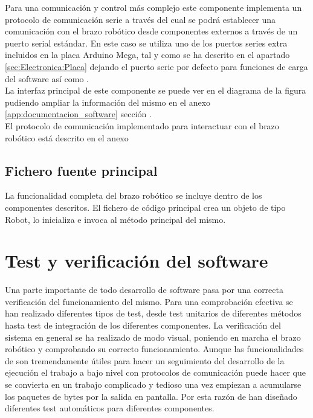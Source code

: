         Para una comunicación y control más complejo este componente implementa un protocolo de comunicación serie a través del cual se podrá establecer una comunicación con el brazo robótico desde componentes externos a través de un puerto serial estándar. En este caso se utiliza uno de los puertos series extra incluidos en la placa Arduino Mega, tal y como se ha descrito en el apartado \ref{sec:Electronica:Placa} dejando el puerto serie por defecto para funciones de carga del software así como .
        \\
        
        La interfaz principal de este componente se puede ver en el diagrama de la figura \completar pudiendo ampliar la información del mismo en el anexo \ref{app:documentacion_software} sección \completar.
        \\
        
        El protocolo de comunicación implementado para interactuar con el brazo robótico está descrito en el anexo \completar

    \subsection{Fichero fuente principal} \label{subsec:SW:maincpp}
        La funcionalidad completa del brazo robótico se incluye dentro de los componentes descritos. El fichero de código principal crea un objeto de tipo Robot, lo inicializa e invoca al método principal del mismo.

\section{Test y verificación del software} \label{sec:SW:test}

    Una parte importante de todo desarrollo de software pasa por una correcta verificación del funcionamiento del mismo. Para una comprobación efectiva se han realizado diferentes tipos de test, desde test unitarios de diferentes métodos hasta test de integración de los diferentes componentes. La verificación del sistema en general se ha realizado de modo visual, poniendo en marcha el brazo robótico y comprobando su correcto funcionamiento. Aunque las funcionalidades de  son tremendamente útiles para hacer un seguimiento del desarrollo de la ejecución el trabajo a bajo nivel con protocolos de comunicación puede hacer que se convierta en un trabajo complicado y tedioso una vez empiezan a acumularse los paquetes de bytes por la salida en pantalla. Por esta razón de han diseñado diferentes test automáticos para diferentes componentes.
    \\
    
